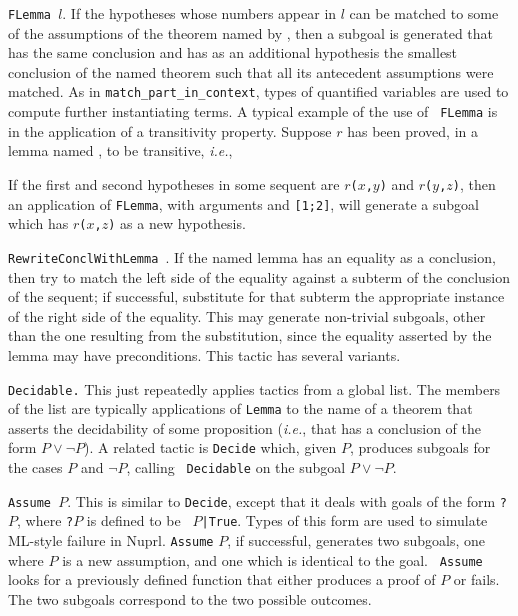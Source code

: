 {\tt FLemma  $l$}.  If the hypotheses whose
numbers appear in $l$ can be matched to some of the assumptions of
the
theorem named by , then a subgoal is generated that has the same
conclusion and has as an additional hypothesis the smallest conclusion of the
named theorem such that all its antecedent assumptions were matched.  As in
{\tt match\_part\_in\_context}, types of quantified variables are used to
compute further instantiating terms.  A typical example of the use of {\tt
FLemma} is in the application of a transitivity property.  Suppose $r$ has been
proved, in a lemma named , to be transitive, {\em i.e.},
\begin{Numath}
\end{Numath}%
If the first and
second hypotheses in some sequent are {\tt $r$($x$,$y$)} and {\tt $r$($y$,$z$)},
then an application of {\tt FLemma}, with arguments  and {\tt [1;2]},
will generate a subgoal which has {\tt $r$($x$,$z$)} as a new hypothesis.



{\tt RewriteConclWithLemma }.  If the named lemma has an equality as
a conclusion, then try to match the left side of the equality against a subterm
of the conclusion of the sequent; if successful, substitute for that subterm the
appropriate instance of the right side of the equality.  This may generate
non-trivial subgoals, other than the one resulting from the substitution, since
the equality asserted by the lemma may have preconditions.  This tactic has
several variants.

{\tt Decidable.} This just repeatedly applies tactics from a global list.
The members of the list are typically applications of {\tt Lemma} to the name
of a theorem that asserts the decidability of some proposition ({\em i.e.},
that has a conclusion of the form $P \vee \neg P$).  A related tactic is
{\tt Decide} which,
given $P$, produces subgoals for the cases $P$ and $\neg P$, calling {\tt
Decidable} on the subgoal $P \vee \neg P$.

{\tt Assume $P$}.  This is similar to {\tt Decide}, except that it deals
with goals of the form {\tt ?$P$}, where {\tt ?$P$} is defined to be {\tt
$P$|True}.  Types of this form are used to simulate ML-style failure in
Nuprl.  {\tt Assume} $P$, if successful, generates two subgoals, one where
$P$ is a new assumption, and one which is identical to the goal.  {\tt
Assume} looks for a previously defined function that either produces a proof
of $P$ or fails.  The two subgoals correspond to the two possible outcomes.

